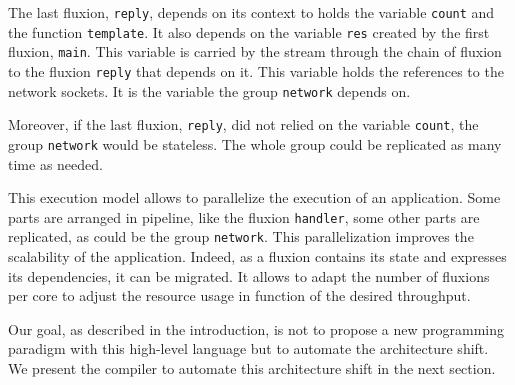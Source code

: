The last fluxion, \texttt{reply}, depends on its context to holds the variable \texttt{count} and the function \texttt{template}.
It also depends on the variable \texttt{res} created by the first fluxion, \texttt{main}.
This variable is carried by the stream through the chain of fluxion to the fluxion \texttt{reply} that depends on it.
This variable holds the references to the network sockets.
It is the variable the group \texttt{network} depends on.

Moreover, if the last fluxion, \texttt{reply}, did not relied on the variable \texttt{count}, the group \texttt{network} would be stateless.
The whole group could be replicated as many time as needed. %

This execution model allows to parallelize the execution of an application.
Some parts are arranged in pipeline, like the fluxion \texttt{handler}, some other parts are replicated, as could be the group \texttt{network}.
This parallelization improves the scalability of the application.
Indeed, as a fluxion contains its state and expresses its dependencies, it can be migrated.
It allows to adapt the number of fluxions per core to adjust the resource usage in function of the desired throughput.



Our goal, as described in the introduction, is not to propose a new programming paradigm with this high-level language but to automate the architecture shift.
We present the compiler to automate this architecture shift in the next section.